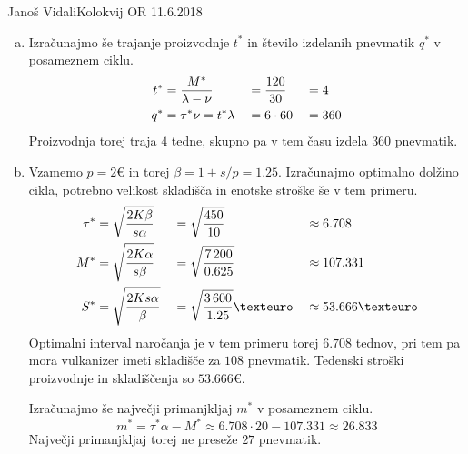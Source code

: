 \begin{naloga}{Janoš Vidali}{Kolokvij OR 11.6.2018}
\begin{odgovor}
\begin{enumerate}[(a)]
\item Izračunajmo še trajanje proizvodnje $t^*$
in število izdelanih pnevmatik $q^*$ v posameznem ciklu.
\begin{alignat*}{3}
t^* &= {M^* \over \lambda - \nu} &&= {120 \over 30} &&= 4 \\
q^* &= \tau^* \nu = t^* \lambda &&= 6 \cdot 60 &&= 360
\end{alignat*}
Proizvodnja torej traja $4$ tedne,
skupno pa v tem času izdela $360$ pnevmatik.

\item Vzamemo $p = 2 €$ in torej $\beta = 1 + s/p = 1.25$.
Izračunajmo optimalno dolžino cikla,
potrebno velikost skladišča in enotske stroške še v tem primeru.
\begin{alignat*}{3}
\tau^* &= \sqrt{2K \beta \over s \alpha}
&&= \sqrt{450 \over 10} &&\approx 6.708 \\
M^* &= \sqrt{2K \alpha \over s \beta}
&&= \sqrt{7\,200 \over 0.625} &&\approx 107.331 \\
S^* &= \sqrt{2Ks \alpha \over \beta}
&&= \sqrt{3\,600 \over 1.25} € &&\approx 53.666 €
\end{alignat*}
Optimalni interval naročanja je v tem primeru torej $6.708$ tednov,
pri tem pa mora vulkanizer imeti skladišče za $108$ pnevmatik.
Tedenski stroški pro\-iz\-vod\-nje in skladiščenja so $53.666 €$.

Izračunajmo še največji primanjkljaj $m^*$ v posameznem ciklu.
$$
m^* = \tau^* \alpha - M^* \approx 6.708 \cdot 20 - 107.331 \approx 26.833
$$
Največji primanjkljaj torej ne preseže $27$ pnevmatik.
\end{enumerate}

\end{odgovor}
\end{naloga}
